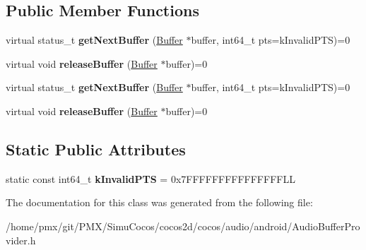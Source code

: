 \subsection*{Public Member Functions}
\begin{DoxyCompactItemize}
\item 
\mbox{\label{classcocos2d_1_1experimental_1_1AudioBufferProvider_a208b208fb59d0cedd4b98c2af2719d3c}} 
virtual status\+\_\+t {\bfseries get\+Next\+Buffer} (\hyperlink{structcocos2d_1_1experimental_1_1AudioBufferProvider_1_1Buffer}{Buffer} $\ast$buffer, int64\+\_\+t pts=k\+Invalid\+P\+TS)=0
\item 
\mbox{\label{classcocos2d_1_1experimental_1_1AudioBufferProvider_ad6fe79e91d4767b2faf91afebe63cca6}} 
virtual void {\bfseries release\+Buffer} (\hyperlink{structcocos2d_1_1experimental_1_1AudioBufferProvider_1_1Buffer}{Buffer} $\ast$buffer)=0
\item 
\mbox{\label{classcocos2d_1_1experimental_1_1AudioBufferProvider_a208b208fb59d0cedd4b98c2af2719d3c}} 
virtual status\+\_\+t {\bfseries get\+Next\+Buffer} (\hyperlink{structcocos2d_1_1experimental_1_1AudioBufferProvider_1_1Buffer}{Buffer} $\ast$buffer, int64\+\_\+t pts=k\+Invalid\+P\+TS)=0
\item 
\mbox{\label{classcocos2d_1_1experimental_1_1AudioBufferProvider_ad6fe79e91d4767b2faf91afebe63cca6}} 
virtual void {\bfseries release\+Buffer} (\hyperlink{structcocos2d_1_1experimental_1_1AudioBufferProvider_1_1Buffer}{Buffer} $\ast$buffer)=0
\end{DoxyCompactItemize}
\subsection*{Static Public Attributes}
\begin{DoxyCompactItemize}
\item 
\mbox{\label{classcocos2d_1_1experimental_1_1AudioBufferProvider_aeb1224b907ad5fd9a1362ee56d555829}} 
static const int64\+\_\+t {\bfseries k\+Invalid\+P\+TS} = 0x7\+F\+F\+F\+F\+F\+F\+F\+F\+F\+F\+F\+F\+F\+F\+F\+LL
\end{DoxyCompactItemize}


The documentation for this class was generated from the following file\+:\begin{DoxyCompactItemize}
\item 
/home/pmx/git/\+P\+M\+X/\+Simu\+Cocos/cocos2d/cocos/audio/android/Audio\+Buffer\+Provider.\+h\end{DoxyCompactItemize}
